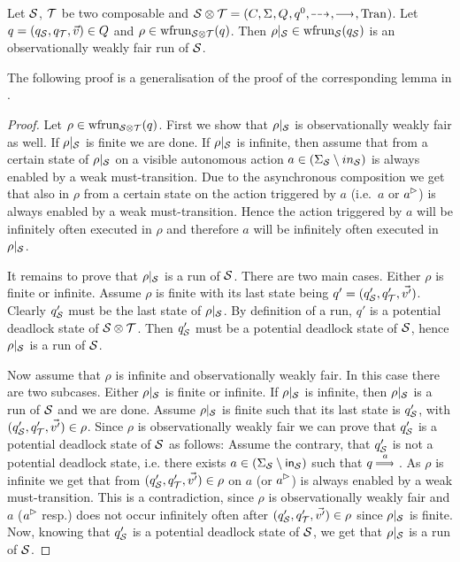 \begin{lemma}\label{lem:projection-run-tgc}
    Let $\S$, $\T$ be two composable \MAIOTSs and $\S\compos\T = \maiotstup{}$. Let $q = (q_\S,q_\T,\vec{v}) \in Q$ and $\rho \in \frun{\S\compos\T}(q)$. Then $\rho|_\S \in \frun{\S}(q_\S)$ is an observationally weakly fair run of $\S$.
\end{lemma}
The following proof is a generalisation of the proof of the corresponding lemma in \cite{TechReportVersion}.

\begin{proof}
    Let $\rho \in \frun{\S\compos\T}(q)$. First we show that $\rho|_\S$ is observationally weakly fair as well. If $\rho|_\S$ is finite we are done. 
If $\rho|_\S$ is infinite, then assume that  from a certain state of $\rho|_\S$ on a visible autonomous action $a \in (\Sigma_\S \setminus in_\S)$ is always enabled by  a weak must-transition. Due to the asynchronous composition
we get that also in $\rho$ from a certain state on the action triggered by $a$ (i.e.\ $a$ or $\outact{a}$) is always enabled  by a weak must-transition. Hence the action triggered by $a$ will be infinitely often executed in $\rho$ and therefore $a$ will be infinitely often executed in $\rho|_\S$.

 It remains to prove that $\rho|_\S$ is a run of $\S$. 
    There are two main cases. Either $\rho$ is finite or infinite. 
    Assume $\rho$ is finite with its last state being $q' = (q'_\S,q'_\T,\vec{v'})$. Clearly $q'_\S$ must be the last state of $\rho|_\S$. By definition of a run, $q'$ is a potential deadlock state of $\S\compos\T$. Then $q'_\S$ must be a potential deadlock state of $\S$, hence $\rho|_\S$ is a run of $\S$.
    
    Now assume that $\rho$ is infinite and observationally weakly fair. In this case there are two subcases. Either $\rho|_\S$ is finite or infinite. If $\rho|_\S$ is infinite, then $\rho|_\S$  is a run of $\S$ and we are done.
Assume $\rho|_\S$ is finite such that its last state is $q'_\S$, with $(q'_\S,q'_\T,\vec{v'}) \in \rho$. Since $\rho$ is observationally weakly fair we can prove that $q'_\S$ is a potential deadlock state of $\S$ as follows: Assume the contrary, that $q'_\S$ is not a potential deadlock state, i.e. there exists $a \in (\Sigma_\S \setminus \inset_\S)$ such that $q \mustw{a} \stateTGC$.
As $\rho$ is infinite we get that from $(q'_\S,q'_\T,\vec{v'}) \in \rho$ on $a$ (or $\outact{a}$) is  always enabled by a weak must-transition.
This is a contradiction, since $\rho$ is observationally weakly fair and $a$ ($\outact{a}$ resp.) does not occur infinitely often after $(q'_\S,q'_\T,\vec{v'}) \in \rho$ since $\rho|_\S$ is finite. Now, knowing that $q'_\S$ is a potential deadlock state of $\S$, we get that $\rho|_\S$ is a run of $\S$. 
\end{proof}


